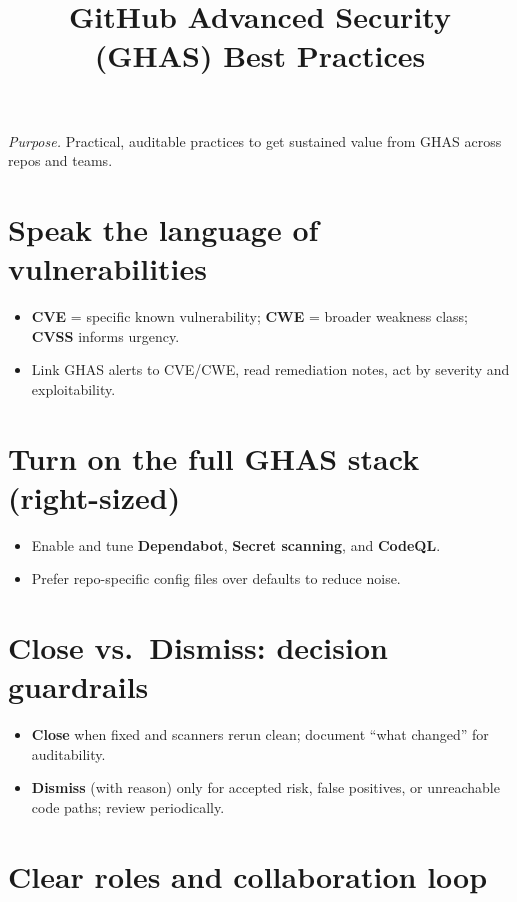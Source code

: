 \documentclass[11pt]{article}
\title{\textbf{GitHub Advanced Security (GHAS) Best Practices}}
\author{}
\date{}
\begin{document}
\maketitle
\vspace{-1em}
\noindent\textit{Purpose.} Practical, auditable practices to get sustained value from GHAS across repos and teams.

\section{Speak the language of vulnerabilities}

\begin{itemize}
  \item \textbf{CVE} = specific known vulnerability; \textbf{CWE} = broader weakness class; \textbf{CVSS} informs urgency.
  \item Link GHAS alerts to CVE/CWE, read remediation notes, act by severity and exploitability.
\end{itemize}

\section{Turn on the full GHAS stack (right-sized)}

\begin{itemize}
  \item Enable and tune \textbf{Dependabot}, \textbf{Secret scanning}, and \textbf{CodeQL}.
  \item Prefer repo-specific config files over defaults to reduce noise.
\end{itemize}

\section{Close vs.\ Dismiss: decision guardrails}

\begin{itemize}
  \item \textbf{Close} when fixed and scanners rerun clean; document ``what changed'' for auditability.
  \item \textbf{Dismiss} (with reason) only for accepted risk, false positives, or unreachable code paths; review periodically.
\end{itemize}

\section{Clear roles and collaboration loop}
\end{document}
